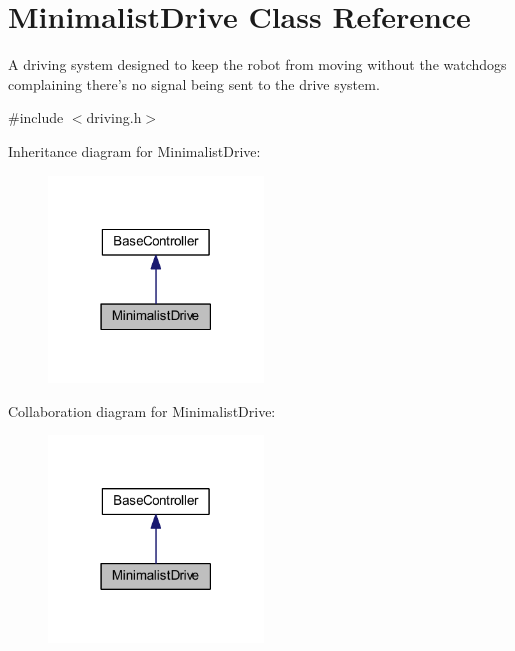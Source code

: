 \hypertarget{class_minimalist_drive}{\section{\-Minimalist\-Drive \-Class \-Reference}
\label{class_minimalist_drive}
}


\-A driving system designed to keep the robot from moving without the watchdogs complaining there's no signal being sent to the drive system.  




{\ttfamily \#include $<$driving.\-h$>$}



\-Inheritance diagram for \-Minimalist\-Drive\-:\nopagebreak
\begin{figure}[H]
\begin{center}
\leavevmode
\includegraphics[width=162pt]{class_minimalist_drive__inherit__graph}
\end{center}
\end{figure}


\-Collaboration diagram for \-Minimalist\-Drive\-:\nopagebreak
\begin{figure}[H]
\begin{center}
\leavevmode
\includegraphics[width=162pt]{class_minimalist_drive__coll__graph}
\end{center}
\end{figure}
